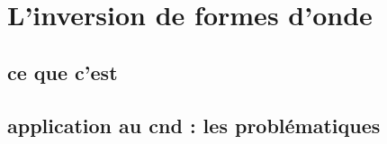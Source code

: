 \chapter{L'inversion de formes d'onde}

\section{ce que c'est}

\section{application au cnd : les problématiques}